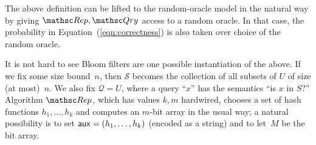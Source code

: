 The above definition can be lifted to the random-oracle model in the natural way
by giving $\Rep, \Qry$ access to a random oracle. In that case,
the probability in Equation~(\ref{eqn:correctness})
is also taken over choice of the random oracle.

It is not hard to see Bloom filters are one possible instantiation of the above. If we fix some
size bound~$n$, then $\mathcal{S}$ becomes the collection of all subsets of $U$
of size (at most)~$n$. We also fix $\mathcal{Q} = U$, where a query ``$x$'' has
the semantics ``is $x$ in $S$?'' Algorithm $\Rep$, which has values $k, m$ hardwired,
chooses a set of hash functions $h_1, \ldots, h_k$ and computes an $m$-bit
array in the usual way; a natural possibility is to set ${\sf aux} = (h_1, \ldots, h_k)$ (encoded as a string) and
to let~$M$ be the bit array.  

